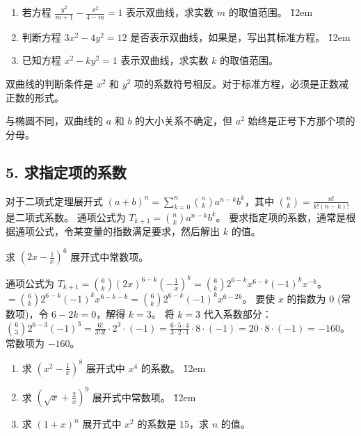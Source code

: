 \begin{problem}
\begin{enumerate}
    \item 若方程 $\frac{y^2}{m+1} - \frac{x^2}{4-m} = 1$ 表示双曲线，求实数 $m$ 的取值范围。
          \v{12em}
    \item 判断方程 $3x^2 - 4y^2 = 12$ 是否表示双曲线，如果是，写出其标准方程。
          \v{12em}
    \item 已知方程 $x^2 - ky^2 = 1$ 表示双曲线，求实数 $k$ 的取值范围。
\end{enumerate}
\end{problem}
\begin{tips}
    双曲线的判断条件是 $x^2$ 和 $y^2$ 项的系数符号相反。对于标准方程，必须是正数减正数的形式。
\end{tips}
\begin{warning}
    与椭圆不同，双曲线的 $a$ 和 $b$ 的大小关系不确定，但 $a^2$ 始终是正号下方那个项的分母。
\end{warning}

\subsection*{5. 求指定项的系数}
\begin{theorem}
    对于二项式定理展开式 $(a+b)^n = \sum_{k=0}^{n} \binom{n}{k} a^{n-k} b^k$，其中 $\binom{n}{k} = \frac{n!}{k!(n-k)!}$ 是二项式系数。
    通项公式为 $T_{k+1} = \binom{n}{k} a^{n-k} b^k$。
    要求指定项的系数，通常是根据通项公式，令某变量的指数满足要求，然后解出 $k$ 的值。
\end{theorem}

\begin{example}
    求 $(2x - \frac{1}{x})^6$ 展开式中常数项。
\end{example}
\begin{solution}
    通项公式为 $T_{k+1} = \binom{6}{k} (2x)^{6-k} (-\frac{1}{x})^k = \binom{6}{k} 2^{6-k} x^{6-k} (-1)^k x^{-k}$。
    $= \binom{6}{k} 2^{6-k} (-1)^k x^{6-k-k} = \binom{6}{k} 2^{6-k} (-1)^k x^{6-2k}$。
    要使 $x$ 的指数为 $0$ (常数项)，令 $6-2k = 0$，解得 $k=3$。
    将 $k=3$ 代入系数部分：
    $\binom{6}{3} 2^{6-3} (-1)^3 = \frac{6!}{3!3!} \cdot 2^3 \cdot (-1) = \frac{6 \cdot 5 \cdot 4}{3 \cdot 2 \cdot 1} \cdot 8 \cdot (-1) = 20 \cdot 8 \cdot (-1) = -160$。
    常数项为 $-160$。
\end{solution}

\begin{problem}
\begin{enumerate}
    \item 求 $(x^2 - \frac{1}{x})^8$ 展开式中 $x^4$ 的系数。
          \v{12em}
    \item 求 $(\sqrt{x} + \frac{2}{x})^9$ 展开式中常数项。
          \v{12em}
    \item 求 $(1 + x)^n$ 展开式中 $x^2$ 的系数是 $15$，求 $n$ 的值。
\end{enumerate}
\end{problem}

